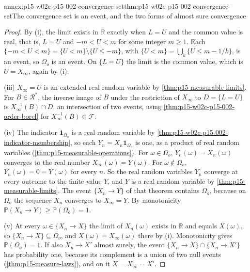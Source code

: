 \begin{annexitem}{annex:p15-w02c-p15-002-convergence-set}{thm:p15-w02c-p15-002-convergence-set}{The convergence set is an event, and the two forms of almost sure convergence}
\begin{proof}
By (i), the limit exists in \(\mathbb R\) exactly when \(L=U\) and the
common value is real, that is, \(L=U\) and \(-m<U<m\) for some integer
\(m\geq1\). Each \(\{-m<U<m\}=\{U<m\}\setminus\{U\leq-m\}\), with
\(\{U<m\}=\bigcup_k\{U\leq m-1/k\}\), is an event, so \(\Omega_o\) is an
event. On \(\{L=U\}\) the limit is the common value, which is \(U=X_\infty\),
again by (i).

(iii) \(X_\infty=U\) is an extended real random variable by
\cref{thm:p15-measurable-limits}. For \(B\in\mathcal R^*\), the inverse
image of \(B\) under the restriction of \(X_\infty\) to \(D=\{L=U\}\) is
\(X_\infty^{-1}(B)\cap D\), an intersection of two events, using
\cref{thm:p15-w02c-p15-002-order-borel} for \(X_\infty^{-1}(B)\in\mathcal F\).

(iv) The indicator \(\mathbf1_{\Omega_o}\) is a real random variable by
\cref{thm:p15-w02c-p15-002-indicator-membership}, so each
\(Y_n=X_n\mathbf1_{\Omega_o}\) is one, as a product of real random
variables (\cref{thm:p15-measurable-operations}). For
\(\omega\in\Omega_o\), \(Y_n(\omega)=X_n(\omega)\) converges to the real
number \(X_\infty(\omega)=Y(\omega)\). For \(\omega\notin\Omega_o\),
\(Y_n(\omega)=0=Y(\omega)\) for every \(n\). So the real random variables
\(Y_n\) converge at every outcome to the finite value \(Y\), and \(Y\) is a
real random variable by \cref{thm:p15-measurable-limits}. The event
\(\{X_n\to Y\}\) of that theorem contains \(\Omega_o\), because on
\(\Omega_o\) the sequence \(X_n\) converges to \(X_\infty=Y\). By
monotonicity \(\mathbb P(X_n\to Y)\geq\mathbb P(\Omega_o)=1\).

(v) At every \(\omega\in\{X_n\to X\}\) the limit of \(X_n(\omega)\)
exists in \(\mathbb R\) and equals \(X(\omega)\), so
\(\{X_n\to X\}\subseteq\Omega_o\), and \(X(\omega)=X_\infty(\omega)\)
there by (i). Monotonicity gives \(\mathbb P(\Omega_o)=1\). If also
\(X_n\to X'\) almost surely, the event \(\{X_n\to X\}\cap\{X_n\to X'\}\)
has probability one, because its complement is a union of two null
events (\cref{thm:p15-measure-laws}), and on it
\(X=X_\infty=X'\).
\end{proof}
\end{annexitem}

